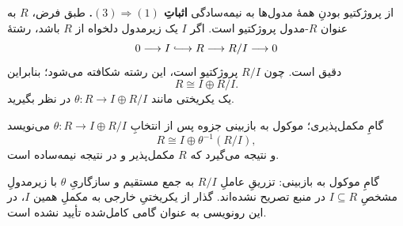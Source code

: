 \begin{frame}[t]{از پروژکتیو بودنِ همهٔ مدول‌ها به نیمه‌سادگی}
  \label{lec18:projective-semisimple-splitting}
  \textbf{اثباتِ $(3)\Rightarrow(1)$.}
  طبق فرض، $R$ به عنوان $R$-مدول پروژکتیو است.
  اگر $I$ یک زیرمدول دلخواه از $R$ باشد، رشتهٔ
  \[
    0\longrightarrow I\lhook\joinrel\longrightarrow R
      \longrightarrow R/I\longrightarrow0
  \]
  دقیق است. چون $R/I$ پروژکتیو است، این رشته شکافته می‌شود؛ بنابراین
  \[
    R\cong I\oplus R/I.
  \]
  یک یکریختی مانند $\theta:R\longrightarrow I\oplus R/I$ در نظر بگیرید.
\end{frame}

\begin{frame}[t]{گامِ مکمل‌پذیری؛ موکول به بازبینی}
  \label{lec18:projective-semisimple-complement-pending}
  جزوه پس از انتخابِ $\theta:R\to I\oplus R/I$ می‌نویسد
  \[
    R\cong I\oplus\theta^{-1}(R/I),
  \]
  و نتیجه می‌گیرد که $R$ مکمل‌پذیر و در نتیجه نیمه‌ساده است.
  \begin{alertblock}{گامِ موکول به بازبینی: }
    تزریقِ عاملِ $R/I$ به جمع مستقیم و سازگاریِ $\theta$ با زیرمدولِ
    مشخصِ $I\subseteq R$ در منبع تصریح نشده‌اند.
    گذار از یکریختیِ خارجی به مکملِ همین $I$، در این رونویسی به عنوان
    گامی کامل‌شده تأیید نشده است.
  \end{alertblock}
\end{frame}
